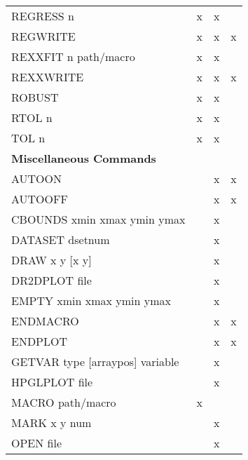 \begin{table}[h]
\begin{center}
\begin{tabular}{lccc}
REGRESS  n                       &     x     &     x  &                    \\
REGWRITE                         &     x     &     x  &       x            \\
REXXFIT  n   path/macro          &     x     &     x  &                    \\
REXXWRITE                        &     x     &     x  &       x            \\
ROBUST                           &     x     &     x  &                    \\
RTOL  n                          &     x     &     x  &                    \\
TOL  n                           &     x     &     x  &                    \\ \hline
{\bf Miscellaneous Commands}     &           &        &                    \\
AUTOON                           &           &     x  &       x            \\
AUTOOFF                          &           &     x  &       x            \\
CBOUNDS xmin xmax ymin ymax      &           &     x  &                    \\
DATASET  dsetnum                 &           &     x  &                    \\
DRAW  x   y  [x   y]             &           &     x  &                    \\
DR2DPLOT  file                   &           &     x  &                    \\
EMPTY xmin xmax ymin ymax        &           &     x  &                    \\
ENDMACRO                         &           &     x  &       x            \\
ENDPLOT                          &           &     x  &       x            \\
GETVAR type [arraypos] variable  &           &     x  &                    \\
HPGLPLOT  file                   &           &     x  &                    \\
MACRO  path/macro                &     x     &        &                    \\
MARK  x   y   num                &           &     x  &                    \\
OPEN  file                       &           &     x  &                    \\

\end{tabular}
\end{center}
\end{table}
